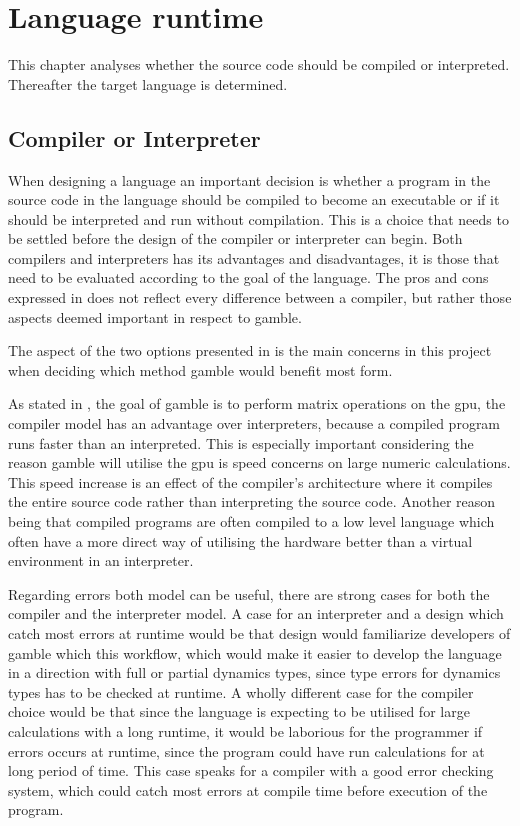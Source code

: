 \chapter{Language runtime}
This chapter analyses whether the source code should be compiled or interpreted.
Thereafter the target language is determined.

\section{Compiler or Interpreter}
When designing a language an important decision is whether a program in the source code in the language should be compiled to become an executable or if it should be interpreted and run without compilation.
This is a choice that needs to be settled before the design of the compiler or interpreter can begin.
Both compilers and interpreters has its advantages and disadvantages, it is those that need to be evaluated according to the goal of the language.
The pros and cons expressed in  does not reflect every difference between a compiler, but rather those aspects deemed important in respect to \gls{gamble}.



The aspect of the two options presented in  is the main concerns in this project when deciding which method \gls{gamble} would benefit most form.

As stated in , the goal of \gls{gamble} is to perform matrix operations on the \acrshort{gpu}, the compiler model has an advantage over interpreters, because a compiled program runs faster than an interpreted. 
This is especially important considering the reason \gls{gamble} will utilise the \acrshort{gpu} is speed concerns on large numeric calculations.
This speed increase is an effect of the compiler's architecture where it compiles the entire source code rather than interpreting  the source code.
Another reason being that compiled programs are often compiled to a low level language which often have a more direct way of utilising the hardware better than a virtual environment in an interpreter.

Regarding errors both model can be useful, there are strong cases for both the compiler and the interpreter model.
A case for an interpreter and a design which catch most errors at runtime would be that design would familiarize developers of \gls{gamble} which this workflow, which would make it easier to develop the language in a direction with full or partial dynamics types, since type errors for dynamics types has to be checked at runtime.
A wholly different case for the compiler choice would be that since the language is expecting to be utilised for large calculations with a long runtime, it would be laborious for the programmer if errors occurs at runtime, since the program could have run calculations for at long period of time.
This case speaks for a compiler with a good error checking system, which could catch most errors at compile time before execution of the program.\citep{Sebesta, Crafting_book}

